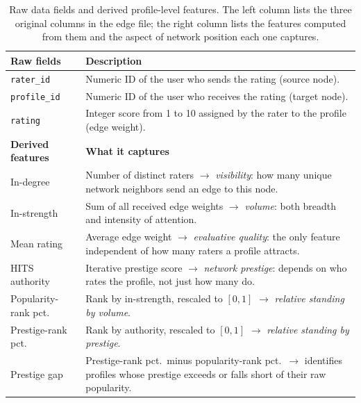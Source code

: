 \documentclass[10pt,twocolumn]{article}
\begin{document}
\begin{table}[h]
    \centering
    \footnotesize
    \caption{Raw data fields and derived profile-level features. The left column lists the three original columns in the edge file; the right column lists the features computed from them and the aspect of network position each one captures.}
    \label{tab:rawfeatures}
    \begin{tabular}{p{}p{}}
        \toprule
        \textbf{Raw fields} & \textbf{Description} \\
        \midrule
        \texttt{rater\_id} & Numeric ID of the user who sends the rating (source node). \\
        \texttt{profile\_id} & Numeric ID of the user who receives the rating (target node). \\
        \texttt{rating} & Integer score from 1 to 10 assigned by the rater to the profile (edge weight). \\
        \midrule
        \textbf{Derived features} & \textbf{What it captures} \\
        \midrule
        In-degree & Number of distinct raters $\to$ \emph{visibility}: how many unique network neighbors send an edge to this node. \\
        In-strength & Sum of all received edge weights $\to$ \emph{volume}: both breadth and intensity of attention. \\
        Mean rating & Average edge weight $\to$ \emph{evaluative quality}: the only feature independent of how many raters a profile attracts. \\
        HITS authority \citep{kleinberg1999authoritative} & Iterative prestige score $\to$ \emph{network prestige}: depends on who rates the profile, not just how many do. \\
        Popularity-rank pct. & Rank by in-strength, rescaled to $[0,1]$ $\to$ \emph{relative standing by volume}. \\
        Prestige-rank pct. & Rank by authority, rescaled to $[0,1]$ $\to$ \emph{relative standing by prestige}. \\
        Prestige gap & Prestige-rank pct.\ minus popularity-rank pct.\ $\to$ identifies profiles whose prestige exceeds or falls short of their raw popularity. \\
        \bottomrule
    \end{tabular}
\end{table}
\end{document}
